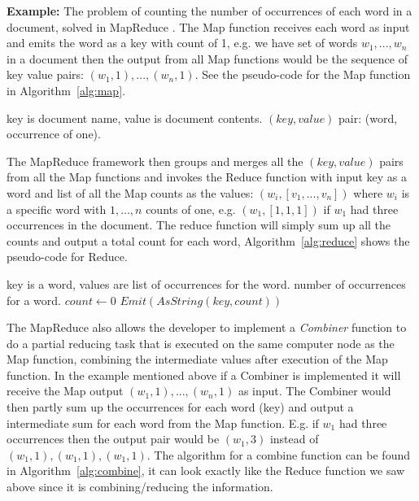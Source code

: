 \textbf{Example:} The problem of counting the number of occurrences of each word in a document, solved in MapReduce \citep{Dean:2004}. The Map function receives each word as input and emits the word as a key with count of 1, e.g. we have set of words $w_1,...,w_n$ in a document then the output from all Map functions would be the sequence of key value pairs: $(w_1,1),...,(w_n,1)$. See the pseudo-code for the Map function in Algorithm~\ref{alg:map}.
\begin{center}
\newcommand{\map}{\ensuremath{\mbox{\sc Map}}}
\begin{algorithm}[h!]
\caption{$\map(key,value)$}\label{alg:map}
\begin{algorithmic}[1]
\REQUIRE key is document name, value is document contents.
\ENSURE $(key,value)$ pair: (word, occurrence of one).
\medskip
{} 
\ENDFOR
\end{algorithmic}
\end{algorithm}
\end{center}
The MapReduce framework then groups and merges all the $(key,value)$ pairs from all the Map functions and invokes the Reduce function with input key as a word and list of all the Map counts as the values: $(w_i,[v_1,...,v_n])$ where $w_i$ is a specific word with $1,...,n$ counts of one, e.g. $(w_1, [1,1,1])$ if $w_1$ had three occurrences in the document. The reduce function will simply sum up all the counts and output a total count for each word, Algorithm~\ref{alg:reduce} shows the pseudo-code for Reduce.
\begin{center}
\newcommand{\reduce}{\ensuremath{\mbox{\sc Reduce}}}
\begin{algorithm}[h!]
\caption{$\reduce(key,values)$}\label{alg:reduce}
\begin{algorithmic}[1]
\REQUIRE key is a word, values are list of occurrences for the word.
\ENSURE number of occurrences for a word.
\STATE $count \leftarrow 0$
\medskip
{} 
\ENDFOR
\STATE $Emit(AsString(key, count))$
\end{algorithmic}
\end{algorithm}
\end{center}
The MapReduce also allows the developer to implement a \textit{Combiner} function to do a partial reducing task that is executed on the same computer node as the Map function, combining the intermediate values after execution of the Map function. In the example mentioned above if a Combiner is implemented it will receive the Map output $(w_1,1),...,(w_n,1)$ as input. The Combiner would then partly sum up the occurrences for each word (key) and output a intermediate sum for each word from the Map function. E.g. if $w_1$ had three occurrences then the output pair would be $(w_1,3)$ instead of $(w_1,1),(w_1,1),(w_1,1)$. The algorithm for a combine function can be found in Algorithm~\ref{alg:combine}, it can look exactly like the Reduce function we saw above since it is combining/reducing the information.
